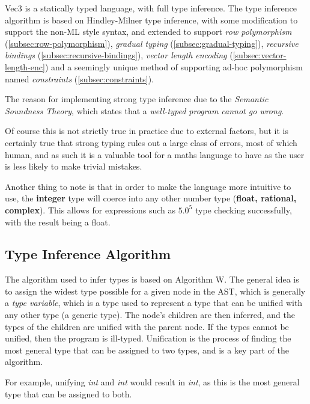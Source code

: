 Vec3 is a statically typed language, with full type inference.
The type inference algorithm is based on Hindley-Milner type inference\citep{sulzmann2000general}, with some
modification to support the non-ML style syntax, and extended to support \textit{row polymorphism}\citep{morris2019abstracting} (\ref{subsec:row-polymorphism}), \textit{gradual typing}\citep{garcia2016abstracting}
(\ref{subsec:gradual-typing}), \textit{recursive bindings} (\ref{subsec:recursive-bindings}), 
\textit{vector length encoding} (\ref{subsec:vector-length-enc}) and a seemingly unique method of supporting ad-hoc 
polymorphism named \textit{constraints} (\ref{subsec:constraints}).

The reason for implementing strong type inference due to the \textit{Semantic Soundness Theory}\citep{timany2024logical}, which states that a \textit{well-typed program cannot go wrong}.

Of course this is not strictly true in practice due to external factors, but it is certainly true that strong typing
rules out a large class of errors, most of which human, and as such it is a valuable tool for a maths language to
have as the user is less likely to make trivial mistakes.

Another thing to note is that in order to make the language more intuitive to use, the \textbf{integer} type will 
coerce into any other number type (\textbf{float, rational, complex}). 
This allows for expressions such as $5.0 ^ 5$ type checking successfully, with the result being a float.

\subsection{Type Inference Algorithm}\label{subsec:type-inference-algorithm}

The algorithm used to infer types is based on Algorithm W\citep{milner1978theory}.
The general idea is to assign the widest type possible for a given node in the AST, which is generally a
\textit{type variable}, which is a type used to represent a type that can be unified with any other type (a generic
type).
The node's children are then inferred, and the types of the children are unified with the parent node.
If the types cannot be unified, then the program is ill-typed.
Unification is the process of finding the most general type that can be assigned to two types, and is a key part of
the algorithm.

For example, unifying \textit{int} and \textit{int} would result in \textit{int}, as this is the most general type that
can be assigned to both.

